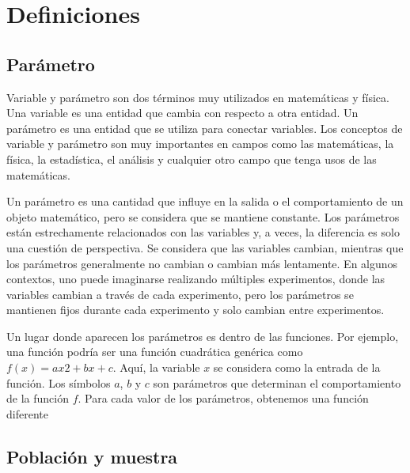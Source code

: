 \pagebreak
\section{Definiciones}

\subsection{Parámetro}

Variable y parámetro son dos términos muy utilizados en matemáticas y física.
Una variable es una entidad que cambia con respecto a otra entidad. Un parámetro
es una entidad que se utiliza para conectar variables. Los conceptos de variable
y parámetro son muy importantes en campos como las matemáticas, la física, la
estadística, el análisis y cualquier otro campo que tenga usos de las
matemáticas.

Un parámetro es una cantidad que influye en la salida o el comportamiento de un
objeto matemático, pero se considera que se mantiene constante. Los parámetros
están estrechamente relacionados con las variables y, a veces, la diferencia es
solo una cuestión de perspectiva. Se considera que las variables cambian,
mientras que los parámetros generalmente no cambian o cambian más lentamente. En
algunos contextos, uno puede imaginarse realizando múltiples experimentos, donde
las variables cambian a través de cada experimento, pero los parámetros se
mantienen fijos durante cada experimento y solo cambian entre experimentos.

Un lugar donde aparecen los parámetros es dentro de las funciones. Por ejemplo,
una función podría ser una función cuadrática genérica como $f(x)=ax2+bx+c$.
Aquí, la variable $x$ se considera como la entrada de la función. Los símbolos
$a$, $b$ y $c$ son parámetros que determinan el comportamiento de la función $f$.
Para cada valor de los parámetros, obtenemos una función diferente

\subsection{Población y muestra}

